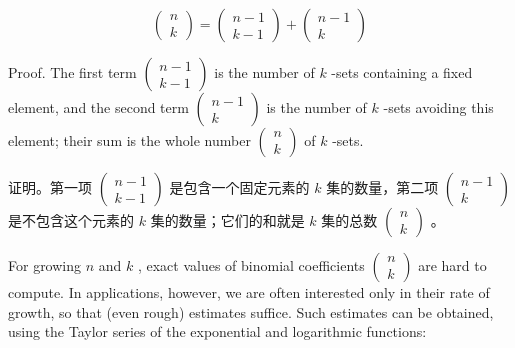 \documentclass[10pt]{article}
\begin{document}
\[
\left( \begin{array}{l} n \\  k \end{array}\right)  = \left( \begin{array}{l} n - 1 \\  k - 1 \end{array}\right)  + \left( \begin{matrix} n - 1 \\  k \end{matrix}\right)
\]

Proof. The first term \(\left( \begin{array}{l} n - 1 \\  k - 1 \end{array}\right)\) is the number of \(k\) -sets containing a fixed element, and the second term \(\left( \begin{matrix} n - 1 \\  k \end{matrix}\right)\) is the number of \(k\) -sets avoiding this element; their sum is the whole number \(\left( \begin{array}{l} n \\  k \end{array}\right)\) of \(k\) -sets.

\begin{tcolorbox}\relax
证明。第一项 \(\left( \begin{array}{l} n - 1 \\  k - 1 \end{array}\right)\) 是包含一个固定元素的 \(k\) 集的数量，第二项 \(\left( \begin{matrix} n - 1 \\  k \end{matrix}\right)\) 是不包含这个元素的 \(k\) 集的数量；它们的和就是 \(k\) 集的总数 \(\left( \begin{array}{l} n \\  k \end{array}\right)\) 。
\end{tcolorbox}

For growing \(n\) and \(k\) , exact values of binomial coefficients \(\left( \begin{array}{l} n \\  k \end{array}\right)\) are hard to compute. In applications, however, we are often interested only in their rate of growth, so that (even rough) estimates suffice. Such estimates can be obtained, using the Taylor series of the exponential and logarithmic functions:
\end{document}
